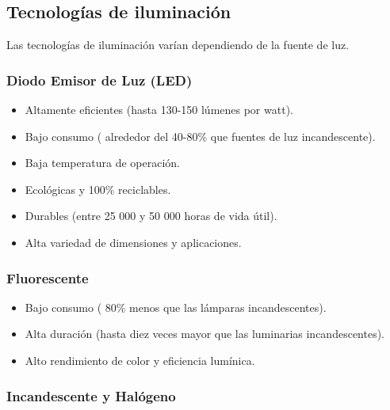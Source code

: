 \subsection{Tecnologías de iluminación}

Las tecnologías de iluminación varían dependiendo de la fuente de luz. \cite{Syl}
 
\subsubsection{Diodo Emisor de Luz (LED)}

\begin{itemize}
	
	\item Altamente eficientes (hasta 130-150 lúmenes por watt).
	
	\item Bajo consumo ( alrededor del 40-80\% que fuentes de luz incandescente).
	
	\item Baja temperatura de operación.
	
	\item Ecológicas y 100\% reciclables.
	
	\item Durables (entre 25 000 y 50 000 horas de vida útil).
	
	\item Alta variedad de dimensiones y aplicaciones.
	
\end{itemize}


\subsubsection{Fluorescente}


\begin{itemize}
	
	\item Bajo consumo ( 80\% menos que las lámparas incandescentes).
	
	\item Alta duración (hasta diez veces mayor que las luminarias incandescentes).
	
	\item Alto rendimiento de color y eficiencia lumínica.
	
\end{itemize}



\subsubsection{Incandescente y Halógeno}


